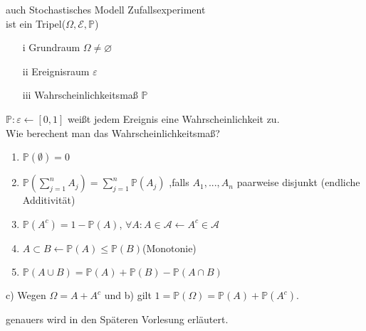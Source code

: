 auch Stochastisches Modell Zufallsexperiment\\
ist ein Tripel($\Omega ,\mathcal{E}, \mathbb{P}$)
\begin{itemize}
    \item [i] Grundraum $\Omega\neq \varnothing  $
    \item [ii] Ereignisraum $\varepsilon $
    \item [iii] Wahrscheinlichkeitsmaß $\mathbb{P}$
\end{itemize}
$\mathbb{P} :\varepsilon \longleftarrow [0,1]$ weißt jedem Ereignis eine Wahrscheinlichkeit zu.\\

Wie berechent man das Wahrscheinlichkeitsmaß?\\
\renewcommand{\labelenumi}{\alph{enumi})}
\begin{enumerate}
    \item $\mathbb{P}(\emptyset) = 0$
    \item $\mathbb{P} (\sum_{j = 1}^{n} A_j)=\sum_{j = 1}^{n}\mathbb{P} (A_j) $ ,falls $A_1,...,A_n$ paarweise disjunkt (endliche Additivität)
    \item $\mathbb{P} (A^c)= 1-\mathbb{P} (A)$, $\forall A:A\in \mathcal{A} \longleftarrow A^c\in \mathcal{A} $
    \item $A\subset B \longleftarrow \mathbb{P}(A)\leq \mathbb{P} (B)$(Monotonie)
    \item $\mathbb{P} (A\cup B)=\mathbb{P} (A)+\mathbb{P} (B)-\mathbb{P} (A\cap B)$
\end{enumerate}
c) Wegen $\Omega = A+A^c$ und b) gilt $1 = \mathbb{P} (\Omega)=\mathbb{P} (A)+\mathbb{P} (A^c)$.

genauers wird in den Späteren Vorlesung erläutert.\\
